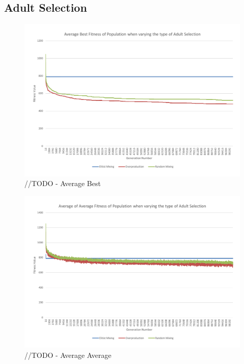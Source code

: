 \subsection{Adult Selection} %
\label{sub:adult_selection}
\begin{figure}
	\centerline{\includegraphics[width=\paperwidth]{figures/CircleTests/CircleTestAdultSelectionAverageBest.pdf}}
	\caption{//TODO - Average Best}
\end{figure}

\begin{figure}
	\centerline{\includegraphics[width=\paperwidth]{figures/CircleTests/CircleTestAdultSelectionAverageAverage.pdf}}
	\caption{//TODO - Average Average}
\end{figure}

